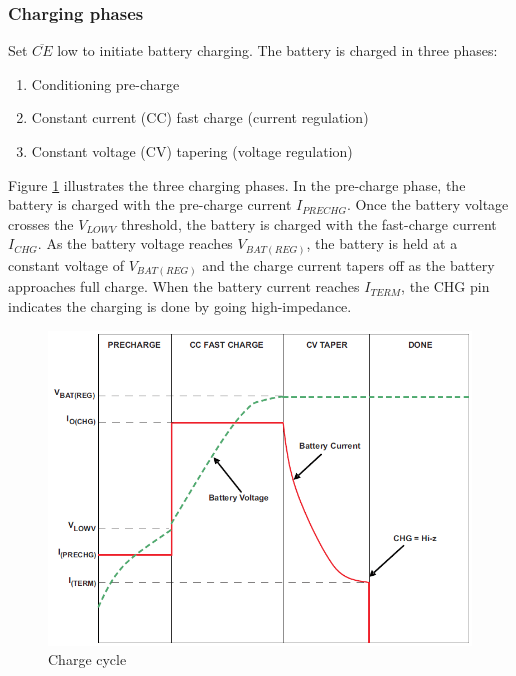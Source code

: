 \documentclass[11pt,a4paper]{article}
\begin{document}
\subsubsection{Charging phases}\label{sec:charging_phases}
Set $\overline{CE}$ low to initiate battery charging. The battery is charged in three phases: 
\begin{enumerate}
	\item Conditioning pre-charge
	\item Constant current (CC) fast charge (current regulation) 
	\item Constant voltage (CV) tapering (voltage regulation)
\end{enumerate}
Figure \ref{fig:Charge _cycle} illustrates the three charging phases. In the pre-charge phase, the battery is charged with the pre-charge current $I_{PRECHG}$. Once the battery voltage crosses the $V_{LOWV}$ threshold, the battery is charged with the fast-charge current $I_{CHG}$. As the battery voltage reaches $V_{BAT(REG)}$, the battery is held at a constant voltage of $V_{BAT(REG)}$ and the charge current tapers off as the battery approaches full charge. When the battery current reaches $I_{TERM}$, the CHG pin indicates the charging is done by going high-impedance.
\begin{figure}[H]
	\centering
	\includegraphics[width=1.0\linewidth]{Charge_cycle}
	\caption{Charge cycle \cite{bib:BQ24075}}
	\label{fig:Charge _cycle}
\end{figure}
\end{document}

